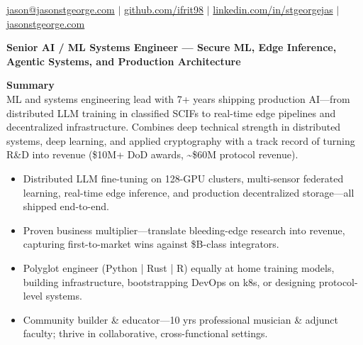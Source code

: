 \documentclass[10.5pt]{res}
\begin{document}
 
{\fontsize{10.5}{6}\selectfont
\centering 
\href{mailto:jason@jasonstgeorge.com}{jason@jasonstgeorge.com} \hspace{.15 cm} $\vert$ \hspace{.15 cm} \href{https://github.com/ifrit98}{github.com/ifrit98} \hspace{.15 cm} $\vert$ \hspace{.15 cm} \href{https://linkedin.com/in/stgeorgejas}{linkedin.com/in/stgeorgejas} \hspace{.15 cm} $\vert$ \hspace{.15 cm} \href{https://jasonstgeorge.com}{jasonstgeorge.com}\\
\hrulefill
}
\vspace{0.25cm}

\begin{resume}
\begin{center}
{\large \textbf{Senior AI / ML Systems Engineer --- Secure ML, Edge Inference, Agentic Systems, and Production Architecture}}
\end{center}
\vspace{-0.15cm}

{\bf Summary} \vspace{.27 cm}\\
ML and systems engineering lead with 7+ years shipping production AI---from distributed LLM training in classified SCIFs to real-time edge pipelines and decentralized infrastructure. Combines deep technical strength in distributed systems, deep learning, and applied cryptography with a track record of turning R\&D into revenue (\$10M+ DoD awards, \textasciitilde\$60M protocol revenue).
\vspace{.27 cm}
\begin{itemize}
    \item Distributed LLM fine-tuning on 128-GPU clusters, multi-sensor federated learning, real-time edge inference, and production decentralized storage---all shipped end-to-end.
    \item Proven business multiplier---translate bleeding-edge research into revenue, capturing first-to-market wins against \$B-class integrators.
    \item Polyglot engineer (Python | Rust | R) equally at home training models, building infrastructure, bootstrapping DevOps on k8s, or designing protocol-level systems.
    \item Community builder \& educator---10 yrs professional musician \& adjunct faculty; thrive in collaborative, cross-functional settings.
\end{itemize}


\end{resume}
\end{document}
